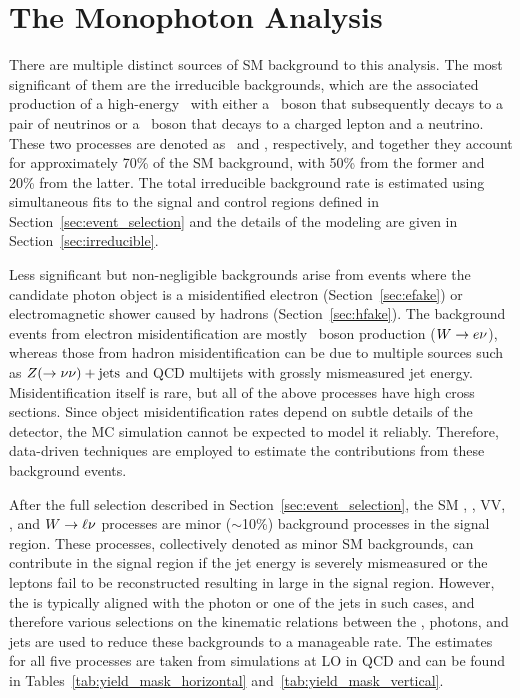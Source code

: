 \chapter{The Monophoton Analysis}
\label{chap:analysis}

There are multiple distinct sources of SM background to this analysis. 
The most significant of them are the irreducible backgrounds, which are the associated production of a high-energy \Pgg\ with either a \PZ\ boson that subsequently decays to a pair of neutrinos or a \PW\ boson that decays to a charged lepton and a neutrino. 
These two processes are denoted as \zinvg\ and \wlng, respectively, and together they account for approximately 70\% of the SM background, with 50\% from the former and 20\% from the latter.
The total irreducible background rate is estimated using simultaneous fits to the signal and control regions defined in Section~\ref{sec:event_selection} and the details of the modeling are given in Section~\ref{sec:irreducible}.

Less significant but non-negligible backgrounds arise from events where the candidate photon object is a misidentified electron (Section~\ref{sec:efake}) or electromagnetic shower caused by hadrons (Section~\ref{sec:hfake}). 
The background events from electron misidentification are mostly \PW\ boson production (${W}\rightarrow {e}\nu$), whereas those from hadron misidentification can be due to multiple sources such as ${Z}(\rightarrow\nu\nu)+\text{jets}$ and QCD multijets with grossly mismeasured jet energy. 
Misidentification itself is rare, but all of the above processes have high cross sections. 
Since object misidentification rates depend on subtle details of the detector, the MC simulation cannot be expected to model it reliably. 
Therefore, data-driven techniques are employed to estimate the contributions from these background events.

After the full selection described in Section~\ref{sec:event_selection}, the SM \gj, \ttg, VV\Pgg, \zllg, and ${W}\to\ell\nu$ processes are minor ($\sim$10\%) background processes in the signal region. 
These processes, collectively denoted as minor SM backgrounds, can contribute in the signal region if the jet energy is severely mismeasured or the leptons fail to be reconstructed resulting in large \met in the signal region. 
However, the \met is typically aligned with the photon or one of the jets in such cases, and therefore various selections on the kinematic relations between the \met, photons, and jets are used to reduce these backgrounds to a manageable rate. 
The estimates for all five processes are taken from \MGvATNLO simulations at LO in QCD and can be found in Tables~\ref{tab:yield_mask_horizontal} and~\ref{tab:yield_mask_vertical}.


